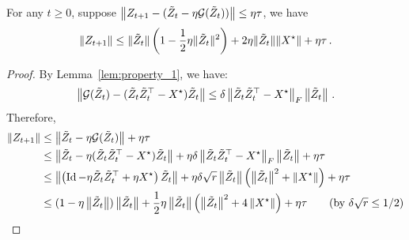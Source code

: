 \begin{lem}\label{lem:Zt}
For any $t \geq 0$, suppose $\left\|Z_{t + 1} - (\tilde{Z}_t - \eta \mathcal{G}(\tilde{Z}_t))\right\| \leq \eta \tau$, we have
\begin{align*}
\| Z_{t + 1} \| \leq \| \tilde{Z}_t \| \left( 1 - \frac{1}{2}\eta \| \tilde{Z}_t\|^2 \right) + 2 \eta \| \tilde{Z}_t \| \| X^\star\| + \eta \tau\,.\nonumber
\end{align*}
\end{lem}
\begin{proof}
	By Lemma~\ref{lem:property_1}, we have: 
	\begin{align}\label{place_4}
	\left\|\mathcal{G}(\tilde{Z}_t) - (\tilde{Z}_t \tilde{Z}_t^{\top} - X^\star )\tilde{Z}_t  \right\| \leq \delta \left\|\tilde{Z}_t \tilde{Z}_t^{\top} - X^\star\right\|_{F} \left\|\tilde{Z}_t \right\|\,. 
	\end{align}
	Therefore, 
	\begin{align*}
	\Norm{Z_{t + 1}  }  &\leq \Norm{\tilde{Z}_t  - \eta \mathcal{G}(\tilde{Z}_t) } + \eta \tau 
	\\
	& \leq \Norm{\tilde{Z}_t   - \eta (\tilde{Z}_t \tilde{Z}_t^{\top} - X^\star )\tilde{Z}_t } + \eta \delta \Norm{\tilde{Z}_t \tilde{Z}_t^{\top} - X^\star}_{F} \Norm{\tilde{Z}_t } + \eta \tau
	\\
	& \leq \Norm{\left(\Id - \eta \tilde{Z}_t \tilde{Z}_t^{\top} + \eta X^\star \right)\tilde{Z}_t } + \eta \delta   \sqrt{r} \Norm{\tilde{Z}_t} \left(\Norm{\tilde{Z}_t}^2 + \Norm{X^\star} \right) + \eta \tau
	\\
	& \leq (1 - \eta \Norm{\tilde{Z}_t}) \Norm{\tilde{Z}_t } + \frac{1}{2}\eta\Norm{\tilde{Z}_t} \left( \Norm{\tilde{Z}_t}^2 + 4\Norm{X^\star}  \right)+ \eta \tau\tag{by $\delta \sqrt{r} \leq 1/2$}
	\end{align*}	
\end{proof}

